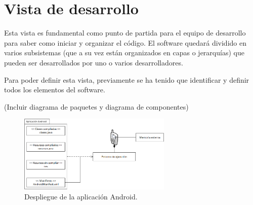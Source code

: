 \chapter{Vista de desarrollo}
Esta vista es fundamental como punto de partida para el equipo de desarrollo para saber como iniciar y organizar el código. El software quedará dividido en varios subsistemas (que a su vez están organizados en capas o jerarquías) que pueden ser desarrollados por uno o varios desarrolladores.

Para poder definir esta vista, previamente se ha tenido que identificar y definir todos los elementos del software.

(Incluir diagrama de paquetes y diagrama de componentes)

\begin{figure}
	\centering
	\includegraphics[width=0.65\textwidth]{4.Disenio/Imagenes/AppAndroid}
	\caption{Despliegue de la aplicación Android.}
	\label{fig:appAndroid}
\end{figure}

